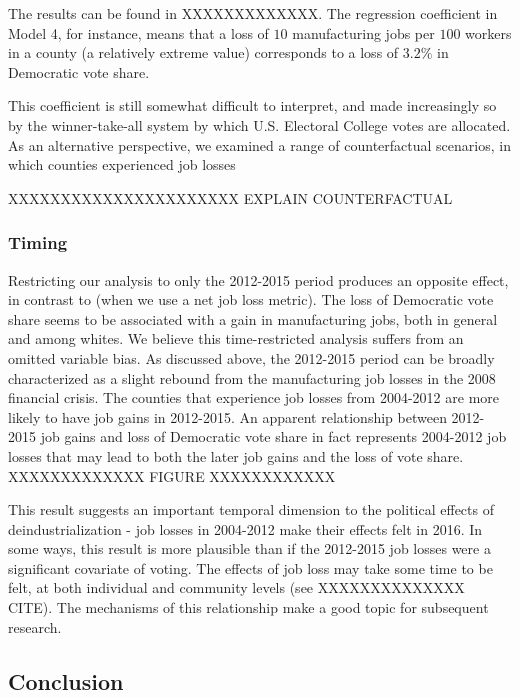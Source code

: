 \documentclass[]{AEA}
\begin{document}
The results can be found in XXXXXXXXXXXXX. The regression coefficient in
Model 4, for instance, means that a loss of \(10\) manufacturing jobs
per \(100\) workers in a county (a relatively extreme value) corresponds
to a loss of \(3.2 \%\) in Democratic vote share.

This coefficient is still somewhat difficult to interpret, and made
increasingly so by the winner-take-all system by which U.S. Electoral
College votes are allocated. As an alternative perspective, we examined
a range of counterfactual scenarios, in which counties experienced job
losses

XXXXXXXXXXXXXXXXXXXXXX EXPLAIN COUNTERFACTUAL

\subsubsection{Timing}

Restricting our analysis to only the 2012-2015 period produces an
opposite effect, in contrast to \cite{BW21} (when we use a net job loss
metric). The loss of Democratic vote share seems to be associated with a
gain in manufacturing jobs, both in general and among whites. We believe
this time-restricted analysis suffers from an omitted variable bias. As
discussed above, the 2012-2015 period can be broadly characterized as a
slight rebound from the manufacturing job losses in the 2008 financial
crisis. The counties that experience job losses from 2004-2012 are more
likely to have job gains in 2012-2015. An apparent relationship between
2012-2015 job gains and loss of Democratic vote share in fact represents
2004-2012 job losses that may lead to both the later job gains and the
loss of vote share. XXXXXXXXXXXXX FIGURE XXXXXXXXXXXX

This result suggests an important temporal dimension to the political
effects of deindustrialization - job losses in 2004-2012 make their
effects felt in 2016. In some ways, this result is more plausible than
if the 2012-2015 job losses were a significant covariate of voting. The
effects of job loss may take some time to be felt, at both individual
and community levels (see XXXXXXXXXXXXXX CITE). The mechanisms of this
relationship make a good topic for subsequent research.

\subsection{Conclusion}
\end{document}
